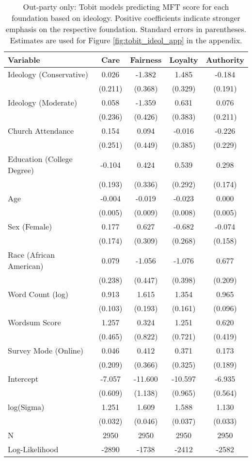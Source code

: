 \begin{table}[ht]
\centering
\caption{Out-party only: Tobit models predicting MFT score for each foundation based 
           on ideology. Positive coefficients indicate stronger emphasis on the respective 
           foundation. Standard errors in parentheses. Estimates are used for  
           Figure \ref{fig:tobit_ideol_app} in the appendix.} 
\label{tab:tobit_out}
\begingroup\footnotesize
\begin{tabular}{lcccc}
  \hline
Variable & Care & Fairness & Loyalty & Authority \\ 
  \hline
Ideology (Conservative) &  0.026 &  -1.382 &   1.485 & -0.184 \\ 
   & (0.211) & (0.368) & (0.329) & (0.191) \\ 
  Ideology (Moderate) &  0.058 &  -1.359 &   0.631 &  0.076 \\ 
   & (0.236) & (0.426) & (0.383) & (0.211) \\ 
  Church Attendance &  0.154 &   0.094 &  -0.016 & -0.226 \\ 
   & (0.251) & (0.449) & (0.385) & (0.229) \\ 
  Education (College Degree) & -0.104 &   0.424 &   0.539 &  0.298 \\ 
   & (0.193) & (0.336) & (0.292) & (0.174) \\ 
  Age & -0.004 &  -0.019 &  -0.023 &  0.000 \\ 
   & (0.005) & (0.009) & (0.008) & (0.005) \\ 
  Sex (Female) &  0.177 &   0.627 &  -0.682 & -0.074 \\ 
   & (0.174) & (0.309) & (0.268) & (0.158) \\ 
  Race (African American) &  0.079 &  -1.056 &  -1.076 &  0.677 \\ 
   & (0.238) & (0.447) & (0.398) & (0.209) \\ 
  Word Count (log) &  0.913 &   1.615 &   1.354 &  0.965 \\ 
   & (0.103) & (0.193) & (0.161) & (0.096) \\ 
  Wordsum Score &  1.257 &   0.324 &   1.251 &  0.620 \\ 
   & (0.465) & (0.822) & (0.721) & (0.419) \\ 
  Survey Mode (Online) &  0.046 &   0.412 &   0.371 &  0.173 \\ 
   & (0.209) & (0.366) & (0.325) & (0.189) \\ 
  Intercept & -7.057 & -11.600 & -10.597 & -6.935 \\ 
   & (0.609) & (1.138) & (0.965) & (0.564) \\ 
  log(Sigma) &  1.251 &   1.609 &   1.588 &  1.130 \\ 
   & (0.032) & (0.046) & (0.037) & (0.033) \\ 
   \hline
N & 2950 & 2950 & 2950 & 2950 \\ 
  Log-Likelihood & -2890 & -1738 & -2412 & -2582 \\ 
   \hline
\end{tabular}
\endgroup
\end{table}
